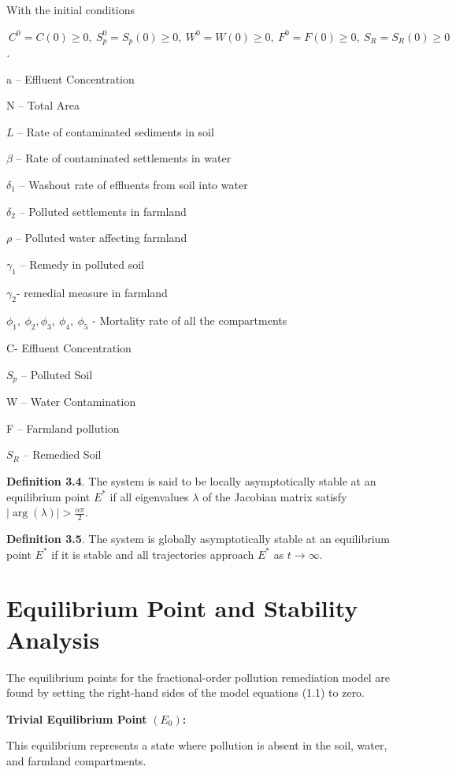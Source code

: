 \documentclass[10pt]{NSP1}
\begin{document}
With the initial conditions

\({\ C}^{0} = C(0) \geq 0,\ S_{p}^{0} = S_{p}(0) \geq 0,\ W^{0} = W(0) \geq 0,\ F^{0} = F(0) \geq 0,\ S_{R} = S_{R}(0) \geq 0\)\emph{.}

a -- Effluent Concentration

N -- Total Area

\(L\) -- Rate of contaminated sediments in soil

\(\beta\) -- Rate of contaminated settlements in water

\(\delta_{1}\) -- Washout rate of effluents from soil into water

\(\delta_{2}\) -- Polluted settlements in farmland

\(\rho\) -- Polluted water affecting farmland

\(\gamma_{1}\) -- Remedy in polluted soil

\(\gamma_{2}\)- remedial measure in farmland

\(\phi_{1},\ \phi_{2},\phi_{3},\ \phi_{4},\ \phi_{5}\) - Mortality rate of all the compartments

C- Effluent Concentration

\(S_{p}\) -- Polluted Soil

W -- Water Contamination

F -- Farmland pollution

\(S_{R}\) -- Remedied Soil

\textbf{Definition 3.4}. \cite{ref7} The system is said to be locally asymptotically stable at an equilibrium point \(E^{*}\) if all eigenvalues \(\lambda\) of the Jacobian matrix satisfy \(\left| \arg(\lambda) \right| > \frac{\alpha\pi}{2}\).

\textbf{Definition 3.5}.\cite{ref7} The system is globally asymptotically stable at an equilibrium point \(E^{*}\) if it is stable and all trajectories approach \(E^{*}\) as \(t \rightarrow \infty\).

\section{Equilibrium Point and Stability Analysis}

The equilibrium points for the fractional-order pollution remediation model are found by setting the right-hand sides of the model equations (1.1) to zero.

\textbf{Trivial Equilibrium Point} \((E_{0})\)\textbf{:}

This equilibrium represents a state where pollution is absent in the soil, water, and farmland compartments.
\end{document}
